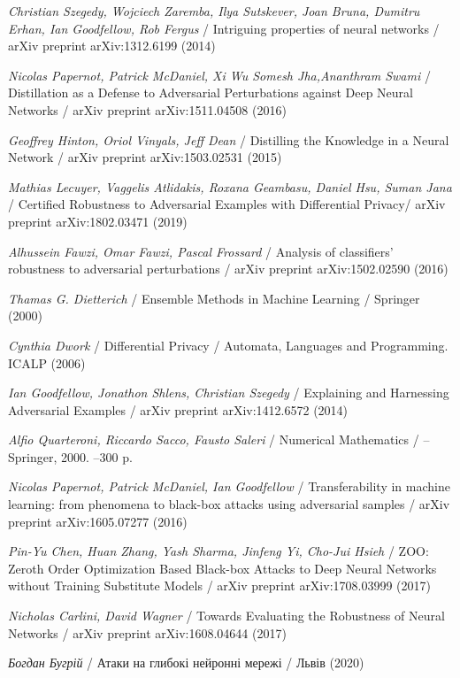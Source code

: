 \documentclass[14pt,a4paper]{extarticle}
\newcounter{e}
\numberwithin{equation}{section}
\numberwithin{figure}{section}
\begin{document}
 \newpage
 \thispagestyle{empty}
 \begin{thebibliography}{99}
	
	\textit{Christian Szegedy, Wojciech Zaremba, Ilya Sutskever, Joan Bruna, Dumitru Erhan, Ian Goodfellow, Rob Fergus} /
	Intriguing properties of neural networks /
	arXiv preprint arXiv:1312.6199 (2014)
	
	\textit{Nicolas Papernot, Patrick McDaniel, Xi Wu Somesh Jha,Ananthram Swami} /
	Distillation as a Defense to Adversarial Perturbations against Deep Neural Networks /
	arXiv preprint arXiv:1511.04508 (2016)
	
	\textit{Geoffrey Hinton, Oriol Vinyals, Jeff Dean} /
	Distilling the Knowledge in a Neural Network /
	arXiv preprint arXiv:1503.02531 (2015)
	
	\textit{Mathias Lecuyer, Vaggelis Atlidakis, Roxana Geambasu, Daniel Hsu, Suman Jana} /
	Certified Robustness to Adversarial Examples with Differential Privacy/
	arXiv preprint arXiv:1802.03471 (2019)
	
	\textit{Alhussein Fawzi, Omar Fawzi, Pascal Frossard} /
	Analysis of classifiers' robustness to adversarial perturbations /
	arXiv preprint arXiv:1502.02590 (2016)
	
	\textit{Thamas G. Dietterich} /
	Ensemble Methods in Machine Learning /
	Springer (2000)
	
	\textit{Cynthia Dwork} /
	Differential Privacy /
	Automata, Languages and Programming. ICALP (2006)
	
	\textit{Ian Goodfellow, Jonathon Shlens, Christian Szegedy} /
	Explaining and Harnessing Adversarial Examples /
	arXiv preprint arXiv:1412.6572 (2014)
	
	\textit{Alfio Quarteroni, Riccardo Sacco, Fausto Saleri} /
	Numerical Mathematics / --
	Springer, 2000. --300 p.
	
	\textit{Nicolas Papernot, Patrick McDaniel, Ian Goodfellow} /
	Transferability in machine learning: from phenomena to black-box attacks using adversarial samples /
	arXiv preprint arXiv:1605.07277 (2016)
	
	\textit{Pin-Yu Chen, Huan Zhang, Yash Sharma, Jinfeng Yi, Cho-Jui Hsieh} /
	ZOO: Zeroth Order Optimization Based Black-box Attacks to Deep Neural Networks without Training Substitute Models /
	arXiv preprint arXiv:1708.03999 (2017)
	
	\textit{Nicholas Carlini, David Wagner} /
	Towards Evaluating the Robustness of Neural Networks /
	arXiv preprint arXiv:1608.04644 (2017)
	
	\textit{Богдан Бугрій} /
	Атаки на глибокі нейронні мережі /
	Львів (2020)
	
	
 \end{thebibliography}

 
\end{document}
